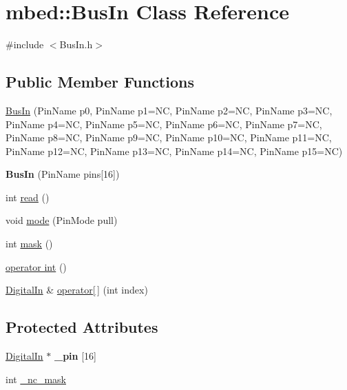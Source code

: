 \hypertarget{classmbed_1_1BusIn}{}\section{mbed\+:\+:Bus\+In Class Reference}
\label{classmbed_1_1BusIn}


{\ttfamily \#include $<$Bus\+In.\+h$>$}

\subsection*{Public Member Functions}
\begin{DoxyCompactItemize}
\item 
\hyperlink{classmbed_1_1BusIn_a60e8a1d93b93bb565d7f6fafacdf6a4b}{Bus\+In} (Pin\+Name p0, Pin\+Name p1=NC, Pin\+Name p2=NC, Pin\+Name p3=NC, Pin\+Name p4=NC, Pin\+Name p5=NC, Pin\+Name p6=NC, Pin\+Name p7=NC, Pin\+Name p8=NC, Pin\+Name p9=NC, Pin\+Name p10=NC, Pin\+Name p11=NC, Pin\+Name p12=NC, Pin\+Name p13=NC, Pin\+Name p14=NC, Pin\+Name p15=NC)
\item 
{\bfseries Bus\+In} (Pin\+Name pins\mbox{[}16\mbox{]})\hypertarget{classmbed_1_1BusIn_ae48033f85c46aa99f9693a0b890e65b8}{}\label{classmbed_1_1BusIn_ae48033f85c46aa99f9693a0b890e65b8}

\item 
int \hyperlink{classmbed_1_1BusIn_aad43475895a43bca659aef8a81dc4478}{read} ()
\item 
void \hyperlink{classmbed_1_1BusIn_a93eed47467fec29854399cb7606a123b}{mode} (Pin\+Mode pull)
\item 
int \hyperlink{classmbed_1_1BusIn_a22dfbea3293e2acda246d88d3545f346}{mask} ()
\item 
\hyperlink{classmbed_1_1BusIn_adb47444fdd5d8928923b39edaa247963}{operator int} ()
\item 
\hyperlink{classmbed_1_1DigitalIn}{Digital\+In} \& \hyperlink{classmbed_1_1BusIn_aa967bad9cca45f21e55385c2ba413236}{operator\mbox{[}$\,$\mbox{]}} (int index)
\end{DoxyCompactItemize}
\subsection*{Protected Attributes}
\begin{DoxyCompactItemize}
\item 
\hyperlink{classmbed_1_1DigitalIn}{Digital\+In} $\ast$ {\bfseries \+\_\+pin} \mbox{[}16\mbox{]}\hypertarget{classmbed_1_1BusIn_a44b9ec611a79d62de2be00c04ee034a1}{}\label{classmbed_1_1BusIn_a44b9ec611a79d62de2be00c04ee034a1}

\item 
int \hyperlink{classmbed_1_1BusIn_a3ccecbfabfbc7bcf74034264be551c3e}{\+\_\+nc\+\_\+mask}
\end{DoxyCompactItemize}


